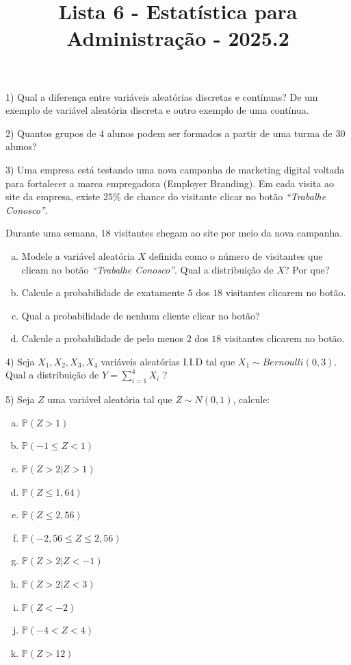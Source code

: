 \documentclass[12pt]{article}
\title{Lista 6 - Estatística para Administração - 2025.2}
\begin{document}
\date{}
\maketitle

1) Qual a diferença entre variáveis aleatórias discretas e contínuas? De um exemplo de variável aleatória discreta e outro exemplo de uma contínua. 

\vspace{3px}

2) Quantos grupos de 4 alunos podem ser formados a partir de uma turma de 30 alunos?

\vspace{3px}

3) Uma empresa está testando uma nova campanha de marketing digital voltada para fortalecer a marca empregadora (Employer Branding).
 Em cada visita ao site da empresa, existe $25\%$ de chance do visitante clicar no botão \textit{“Trabalhe Conosco”}. 

    Durante uma semana, $18$ visitantes chegam ao site por meio da nova campanha.

    \begin{enumerate}[a)]
        \item Modele a variável aleatória $X$ definida como o número de visitantes que clicam no botão \textit{“Trabalhe Conosco”}. Qual a distribuição de $X$? Por que?
        \item Calcule a probabilidade de exatamente $5$ dos $18$ visitantes clicarem no botão.
        \item Qual a probabilidade de nenhum cliente clicar no botão?
        \item Calcule a probabilidade de pelo menos $2$ dos $18$ visitantes clicarem no botão.
    \end{enumerate}

\vspace{3px}

4) Seja $X_1, X_2, X_3, X_4$ variáveis aleatórias I.I.D tal que $X_1 \sim Bernoulli(0,3)$. Qual a distribuição de $Y=\displaystyle\sum_{i=1}^4 X_i$ ?

\vspace{3px}

5) Seja $Z$ uma variável aleatória tal que $Z\sim N(0,1)$, calcule:

\begin{enumerate}[a)]
    \item $\mathds{P}(Z>1)$
    \item $\mathds{P}(-1 \leq Z<1)$
    \item $\mathds{P}(Z>2| Z> 1)$
    \item $\mathds{P}(Z\leq 1,64)$
    \item $\mathds{P}(Z \leq 2,56)$
    \item $\mathds{P}(-2,56 \leq Z \leq 2,56)$
    \item $\mathds{P}(Z>2| Z< -1)$
    \item $\mathds{P}(Z>2| Z< 3)$
    \item $\mathds{P}(Z<-2)$
    \item $\mathds{P}(-4<Z<4)$
    \item $\mathds{P}(Z>12)$
\end{enumerate}
\end{document}
